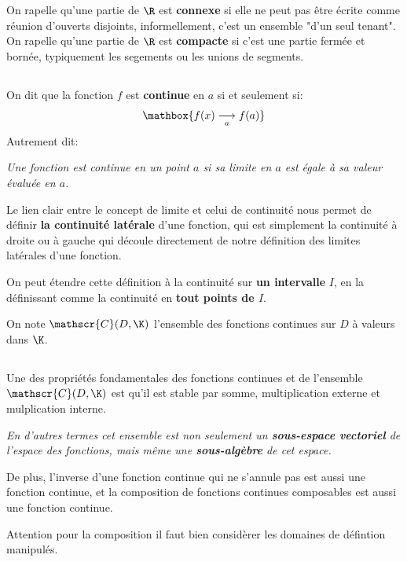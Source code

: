 On rapelle qu'une partie de \(\R\) est \textbf{connexe} si elle ne peut pas être écrite comme réunion d'ouverts disjoints, informellement, c'est un ensemble "d'un seul tenant".\+
On rapelle qu'une partie de \(\R\) est \textbf{compacte} si c'est une partie fermée et bornée, typiquement les segements ou les unions de segments.

\subsection*{}

On dit que la fonction \(f\) est \textbf{continue} en \(a\) si et seulement si:
\[
   \mathbox{f(x) \underset{a}{\longrightarrow} f(a)}   
\]
Autrement dit:
\begin{center}
   \textit{
      Une fonction est continue en un point \(a\) si sa limite en \(a\) est égale à sa valeur évaluée en \(a\).
   }
\end{center}
Le lien clair entre le concept de limite et celui de continuité nous permet de définir \textbf{la continuité latérale} d'une fonction, qui est simplement la continuité à droite ou à gauche qui découle directement de notre définition des limites latérales d'une fonction.\<

On peut étendre cette définition à la continuité sur \textbf{un intervalle} \(I\), en la définissant comme la continuité en \textbf{tout points de \(I\)}.\+

On note \(\mathscr{C}(D, \K)\) l'ensemble des fonctions continues sur \(D\) à valeurs dans \(\K\).

\subsection*{}
Une des propriétés fondamentales des fonctions continues et de l'ensemble \(\mathscr{C}(D, \K)\) est qu'il est stable par somme, multiplication externe et mulplication interne.
\begin{center}
   \textit{
      En d'autres termes cet ensemble est non seulement un \textbf{sous-espace vectoriel} de l'espace des fonctions, mais même une \textbf{sous-algèbre} de cet espace.
   }
\end{center}
De plus, l'inverse d'une fonction continue qui ne s'annule pas est aussi une fonction continue, et la composition de fonctions continues composables est aussi une fonction continue.\<

Attention pour la composition il faut bien considèrer les domaines de défintion manipulés.

